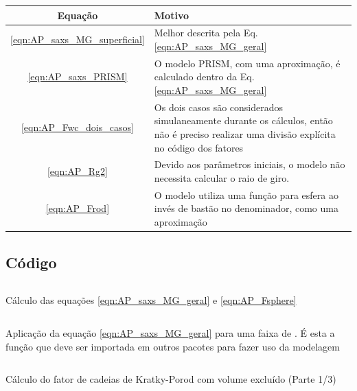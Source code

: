 \begin{apendicesenv}
\begin{table}[H]
	{%
		\begin{tabular}{c p{10cm}}
			\toprule
			Equação   & Motivo  \\ \midrule
			\ref{eqn:AP_saxs_MG_superficial} & Melhor descrita pela Eq. \ref{eqn:AP_saxs_MG_geral} \\
			\ref{eqn:AP_saxs_PRISM} & O modelo PRISM, com uma aproximação, é calculado dentro da Eq. \ref{eqn:AP_saxs_MG_geral}  \\
			\ref{eqn:AP_Fwc_dois_casos} & Os dois casos são considerados simulaneamente durante os cálculos, então não é preciso realizar uma divisão explícita no código dos fatores \\
			\ref{eqn:AP_Rg2} & Devido aos parâmetros iniciais, o modelo não necessita calcular o raio de giro. \\
			\ref{eqn:AP_Frod}  & O modelo utiliza uma função para esfera ao invés de bastão no denominador, como uma aproximação \\ \bottomrule
		\end{tabular}%
	}{}
\end{table}

	\subsection{Código}

	\begin{listing}[H]
		\inputminted{python}{./python/cadeias_WLM_1.py}
		\caption{Cálculo das equações \ref{eqn:AP_saxs_MG_geral} e \ref{eqn:AP_Fsphere}}
		\label{lst:WLM_geral}
	\end{listing}
	
	\begin{listing}[H]
	\inputminted{python}{./python/cadeias_WLM_2.py}
	\caption{Aplicação da equação \ref{eqn:AP_saxs_MG_geral} para uma faixa de \q. É esta a função que deve ser importada em outros pacotes para fazer uso da modelagem}
	\label{lst:WLM_whole_q}
	\end{listing}
	

%	
	\begin{listing}[H]
		\inputminted{python}{./python/cadeia_kratky_porod_inicial_1.py}
		\caption{Cálculo do fator de cadeias de Kratky-Porod com volume excluído (Parte 1/3)}
		\label{lst:cadeia_KP_1}
	\end{listing}


\end{apendicesenv}
